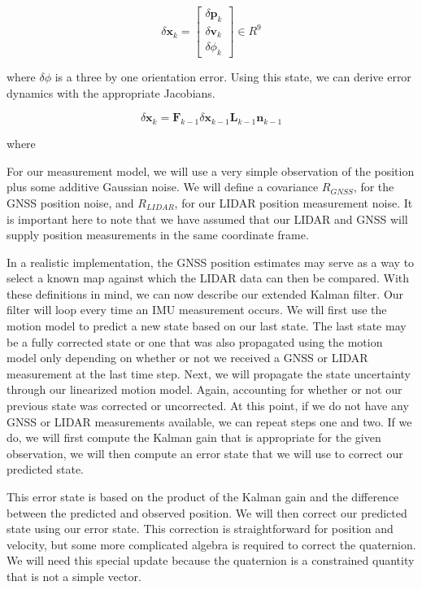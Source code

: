 \begin{equation}
\delta \mathbf{x}_k = 
\begin{bmatrix}
\delta \mathbf{p}_k \\
\delta \mathbf{v}_k \\
\delta \phi_k
\end{bmatrix} \in R^9
\end{equation}

where $\delta \phi$ is a three by one orientation error. Using this state,
we can derive error dynamics with the appropriate Jacobians. 

\begin{equation}
\delta \mathbf{x}_k = \mathbf{F}_{k - 1} \delta \mathbf{x}_{k-1} \mathbf{L}_{k-1} \mathbf{n}_{k-1}
\end{equation}

where

For our measurement model, we will use a very
simple observation of the position plus some additive Gaussian noise. We will define
a covariance $R_{GNSS}$, for the GNSS
position noise, and $R_{LIDAR}$, for our LIDAR position measurement noise. It is important here
to note that we have assumed that our LIDAR and GNSS will supply
position measurements in the same
coordinate frame. 

In a realistic implementation, the GNSS position estimates may serve as a way to select a known map against which
the LIDAR data can then be compared. With these
definitions in mind, we can now describe our extended
Kalman filter. Our filter will loop every time an IMU
measurement occurs. We will first use the
motion model to predict a new state based
on our last state. The last state may be a fully corrected state or one that was
also propagated using the motion model only depending on whether or not we received a GNSS or
LIDAR measurement at the last time step. Next, we will propagate the state uncertainty through our linearized
motion model. Again, accounting for whether or not our previous state was corrected or uncorrected. At this point,
if we do not have any GNSS or LIDAR
measurements available, we can repeat
steps one and two. If we do, we will
first compute the Kalman gain that is appropriate for the given observation, we will then compute
an error state that we will use to correct
our predicted state. 

This error state is based on the product of
the Kalman gain and the difference between the predicted and
observed position. We will then correct our predicted state
using our error state. This correction is
straightforward for position and velocity, but some more
complicated algebra is required to correct
the quaternion. We will need
this special update because the quaternion is a constrained
quantity that is not a simple vector. 

